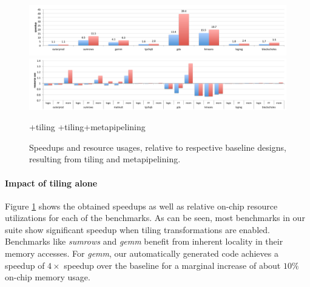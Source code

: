 \begin{figure}
\centering
\includegraphics[width=\textwidth]{3-delite/figs/newspeedupbars1.pdf}
\vspace{10pt}
\includegraphics[width=\textwidth]{3-delite/figs/newspeedupbars2.pdf}

{
\selectfont
\footnotesize
+tiling
\hspace{2em}
+tiling+metapipelining
}

\caption{Speedups and resource usages, relative to respective baseline designs, resulting from tiling and metapipelining.}
\label{fig:speedup-bars}
\end{figure}

\paragraph{Impact of tiling alone}
Figure \ref{fig:speedup-bars} shows the obtained speedups as well as relative on-chip resource utilizations for each of the benchmarks.
As can be seen, most benchmarks in our suite show significant speedup when tiling
transformations are enabled. Benchmarks like \emph{sumrows} and \emph{gemm}
benefit from inherent locality in their memory accesses. For \emph{gemm}, our automatically generated code
achieves a speedup of $4\times$ speedup over the baseline for a marginal increase of about $10\%$ on-chip memory usage.


